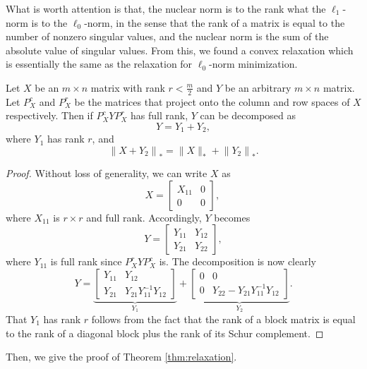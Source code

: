 \documentclass[11pt]{article}
\begin{document}
What is worth attention is that, the nuclear norm is to the rank what the \(\ell_1\)-norm is to the \(\ell_0\)-norm, in the sense that the rank of a matrix is equal to the number of nonzero singular values, and the nuclear norm is the sum of the absolute value of singular values. From this, we found a convex relaxation which is essentially the same as the relaxation for \(\ell_0\)-norm minimization. 
\begin{lemma}
    Let $X$ be an $m\times n$ matrix with rank $r<\frac{m}{2}$ and $Y$ be an arbitrary $m \times n$ matrix. Let $P_{X}^{c}$ and $P_{X}^{r}$ be the matrices that project onto the column and row spaces of $X$ respectively. Then if $P_{X}^{c} Y P_{X}^{r}$ has full rank, $Y$ can be decomposed as
    $$
    Y=Y_{1}+Y_{2},
    $$
    where $Y_{1}$ has rank $r$, and
    $$
    \left\|X+Y_{2}\right\|_{*}=\|X\|_{*}+\left\|Y_{2}\right\|_{*} .
    $$
\end{lemma}
\begin{proof}
Without loss of generality, we can write $X$ as
$$
X=\left[\begin{array}{cc}
X_{11} & 0 \\
0 & 0
\end{array}\right] \text {, }
$$
where $X_{11}$ is $r \times r$ and full rank. Accordingly, $Y$ becomes
$$
Y=\left[\begin{array}{ll}
Y_{11} & Y_{12} \\
Y_{21} & Y_{22}
\end{array}\right],
$$
where $Y_{11}$ is full rank since $P_{X}^{r} Y P_{X}^{c}$ is. The decomposition is now clearly
$$
Y=\underbrace{\left[\begin{array}{cc}
Y_{11} & Y_{12} \\
Y_{21} & Y_{21} Y_{11}^{-1} Y_{12}
\end{array}\right]}_{Y_{1}}+\underbrace{\left[\begin{array}{cc}
0 & 0 \\
0 & Y_{22}-Y_{21} Y_{11}^{-1} Y_{12}
\end{array}\right]}_{Y_{2}} .
$$
That $Y_{1}$ has rank $r$ follows from the fact that the rank of a block matrix is equal to the rank of a diagonal block plus the rank of its Schur complement.
\end{proof}
Then, we give the proof of Theorem \ref{thm:relaxation}.
\end{document}
